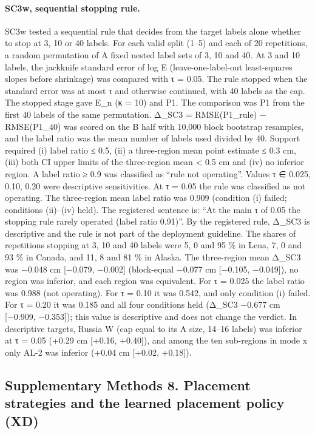 \paragraph*{SC3w, sequential stopping rule.} SC3w tested a sequential rule that decides from the target labels alone whether to stop at 3, 10 or 40 labels. For each valid split (1–5) and each of 20 repetitions, a random permutation of A fixed nested label sets of 3, 10 and 40. At 3 and 10 labels, the jackknife standard error of log E (leave-one-label-out least-squares slopes before shrinkage) was compared with τ = 0.05. The rule stopped when the standard error was at most τ and otherwise continued, with 40 labels as the cap. The stopped stage gave E\_n (κ = 10) and P1. The comparison was P1 from the first 40 labels of the same permutation. Δ\_SC3 = RMSE(P1\_rule) − RMSE(P1\_40) was scored on the B half with 10,000 block bootstrap resamples, and the label ratio was the mean number of labels used divided by 40. Support required (i) label ratio ≤ 0.5, (ii) a three-region mean point estimate ≤ 0.3 cm, (iii) both CI upper limits of the three-region mean < 0.5 cm and (iv) no inferior region. A label ratio ≥ 0.9 was classified as ``rule not operating''. Values τ ∈ {0.025, 0.10, 0.20} were descriptive sensitivities. At τ = 0.05 the rule was classified as not operating. The three-region mean label ratio was 0.909 (condition (i) failed; conditions (ii)–(iv) held). The registered sentence is: ``At the main τ of 0.05 the stopping rule rarely operated (label ratio 0.91)''. By the registered rule, Δ\_SC3 is descriptive and the rule is not part of the deployment guideline. The shares of repetitions stopping at 3, 10 and 40 labels were 5, 0 and 95 \% in Lena, 7, 0 and 93 \% in Canada, and 11, 8 and 81 \% in Alaska. The three-region mean Δ\_SC3 was −0.048 cm [−0.079, −0.002] (block-equal −0.077 cm [−0.105, −0.049]), no region was inferior, and each region was equivalent. For τ = 0.025 the label ratio was 0.988 (not operating). For τ = 0.10 it was 0.542, and only condition (i) failed. For τ = 0.20 it was 0.185 and all four conditions held (Δ\_SC3 −0.677 cm [−0.909, −0.353]); this value is descriptive and does not change the verdict. In descriptive targets, Russia W (cap equal to its A size, 14–16 labels) was inferior at τ = 0.05 (+0.29 cm [+0.16, +0.40]), and among the ten sub-regions in mode x only AL-2 was inferior (+0.04 cm [+0.02, +0.18]).

\subsection*{Supplementary Methods 8. Placement strategies and the learned placement policy (XD)}

